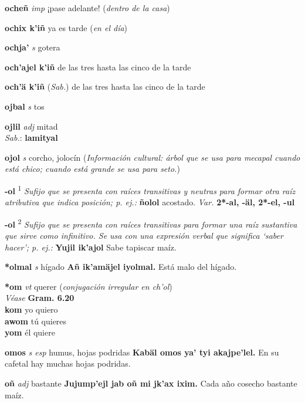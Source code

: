 \documentclass[10pt]{scrbook}
\newcommand{\entry}[1]{\textbf{#1}}
\newcommand{\defsuperscript}[1]{\textsuperscript{#1}}
\newcommand{\nontranslationdef}[1]{\textit{#1}}
\newcommand{\partofspeech}[1]{\textit{#1}}
\newcommand{\spanishtranslation}[1]{#1}
\newcommand{\clarification}[1]{(\textit{#1})}
\newcommand{\cholexample}[1]{\textbf{#1}}
\newcommand{\exampletranslation}[1]{#1}
\newcommand{\dialectvariant}[1]{\\\textit{#1}:}
\newcommand{\dialectword}[1]{\textbf{#1}}
\newcommand{\alsosee}[1]{\\\textit{Véase} \textbf{#1}}
\newcommand{\relevantdialect}[1]{(\textit{#1})}
\newcommand{\culturalinformation}[1]{(\textit{#1})}
\newcommand{\secondaryentry}[1]{\\\textbf{#1}}
\newcommand{\secondtranslation}[1]{#1}
\newcommand{\variation}[1]{\textit{Var.} \textbf{#1}}
\begin{document}
\begin{multicols}{2}
\entry{ocheñ}
\partofspeech{imp}
\spanishtranslation{¡pase adelante!}
\clarification{dentro de la casa}

\entry{ochix k'iñ}
\spanishtranslation{ya es tarde}
\clarification{en el día}

\entry{ochja'}
\partofspeech{s}
\spanishtranslation{gotera}

\entry{och'ajel k'iñ}
\spanishtranslation{de las tres hasta las cinco de la tarde}

\entry{och'ä k'iñ}
\relevantdialect{Sab.}
\spanishtranslation{de las tres hasta las cinco de la tarde}

\entry{ojbal}
\partofspeech{s}
\spanishtranslation{tos}

\entry{ojlil}
\partofspeech{adj}
\spanishtranslation{mitad}
\dialectvariant{Sab.}
\dialectword{lamityal}

\entry{ojol}
\partofspeech{s}
\spanishtranslation{corcho, jolocín}
\culturalinformation{Información cultural: árbol que se usa para mecapal cuando está chico; cuando está grande se usa para seto.}

\entry{-ol}
\defsuperscript{1}
\nontranslationdef{Sufijo que se presenta con raíces transitivas y neutras para formar otra raíz atributiva que indica posición; p. ej.:}
\cholexample{ñolol}
\exampletranslation{acostado.}
\variation{2*-al, -äl, 2*-el, -ul}

\entry{-ol}
\defsuperscript{2}
\nontranslationdef{Sufijo que se presenta con raíces transitivas para formar una raíz sustantiva que sirve como infinitivo. Se usa con una expresión verbal que significa ‘saber hacer’; p. ej.:}
\cholexample{Yujil ik'ajol}
\exampletranslation{Sabe tapiscar maíz.}

\entry{*olmal}
\partofspeech{s}
\spanishtranslation{hígado}
\cholexample{Añ ik'amäjel iyolmal.}
\exampletranslation{Está malo del hígado.}

\entry{*om}
\partofspeech{vt}
\spanishtranslation{querer}
\clarification{conjugación irregular en ch'ol}
\alsosee{Gram. 6.20}
\secondaryentry{kom}
\secondtranslation{yo quiero}
\secondaryentry{awom}
\secondtranslation{tú quieres}
\secondaryentry{yom}
\secondtranslation{él quiere}

\entry{omos}
\partofspeech{s esp}
\spanishtranslation{humus, hojas podridas}
\cholexample{Kabäl omos ya' tyi akajpe'lel.}
\exampletranslation{En su cafetal hay muchas hojas podridas.}

\entry{oñ}
\partofspeech{adj}
\spanishtranslation{bastante}
\cholexample{Jujump'ejl jab oñ mi jk'ax ixim.}
\exampletranslation{Cada año cosecho bastante maíz.}


\end{multicols}
\end{document}
